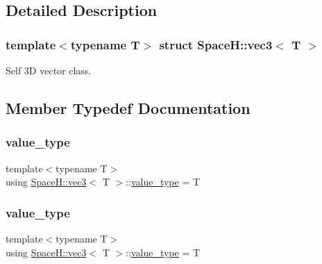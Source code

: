 \subsection{Detailed Description}
\subsubsection*{template$<$typename T$>$\newline
struct Space\+H\+::vec3$<$ T $>$}

Self 3D vector class. 

\subsection{Member Typedef Documentation}
\mbox{\label{struct_space_h_1_1vec3_a08579f643d09de9cf876530068fe8f7d}} 
\subsubsection{\texorpdfstring{value\+\_\+type}{value\_type}\hspace{0.1cm}{\footnotesize\ttfamily [1/4]}}
{\footnotesize\ttfamily template$<$typename T$>$ \\
using \mbox{\hyperlink{struct_space_h_1_1vec3}{Space\+H\+::vec3}}$<$ T $>$\+::\mbox{\hyperlink{struct_space_h_1_1vec3_a08579f643d09de9cf876530068fe8f7d}{value\+\_\+type}} =  T}

\mbox{\label{struct_space_h_1_1vec3_a08579f643d09de9cf876530068fe8f7d}} 
\subsubsection{\texorpdfstring{value\+\_\+type}{value\_type}\hspace{0.1cm}{\footnotesize\ttfamily [2/4]}}
{\footnotesize\ttfamily template$<$typename T$>$ \\
using \mbox{\hyperlink{struct_space_h_1_1vec3}{Space\+H\+::vec3}}$<$ T $>$\+::\mbox{\hyperlink{struct_space_h_1_1vec3_a08579f643d09de9cf876530068fe8f7d}{value\+\_\+type}} =  T}

